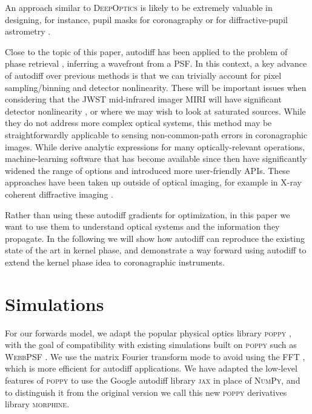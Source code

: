 \documentclass[modern]{aastex63}
\begin{document}
An approach similar to \textsc{DeepOptics} is likely to be extremely valuable in designing, for instance, pupil masks for coronagraphy \citep[e.g.][]{guyon03,carlotti11} or for diffractive-pupil astrometry \citep[e.g.][]{guyon12,tuthill18}. 

Close to the topic of this paper, autodiff has been applied to the problem of phase retrieval \citep{jurling14,paine19}, inferring a wavefront from a PSF. In this context, a key advance of autodiff over previous methods is that we can trivially account for pixel sampling/binning and detector nonlinearity. These will be important issues when considering that the JWST mid-infrared imager MIRI will have significant detector nonlinearity \citep{rieke15}, or where we may wish to look at saturated sources.  While they do not address more complex optical systems, this method may be straightforwardly applicable to sensing non-common-path errors in coronagraphic images. While \citet{jurling14} derive analytic expressions for many optically-relevant operations, machine-learning software that has become available since then have significantly widened the range of options and introduced more user-friendly APIs. These approaches have been taken up outside of optical imaging, for example in X-ray coherent diffractive imaging \citep{kandel19,nashed19}.

Rather than using these autodiff gradients for optimization, in this paper we want to use them to understand optical systems and the information they propagate.
In the following we will show how autodiff can reproduce the existing state of the art in kernel phase, and demonstrate a way forward using autodiff to extend the kernel phase idea to coronagraphic instruments.

\section{Simulations}
\label{sec:method}

For our forwards model, we adapt the popular physical optics library \textsc{poppy} \citep{poppy}, with the goal of compatibility with existing simulations built on \textsc{poppy} such as \textsc{WebbPSF} \citep{webbpsf}. We use the matrix Fourier transform mode to avoid using the FFT \citet{soummer07}, which is more efficient for autodiff applications. We have adapted the low-level features of \textsc{poppy} to use the Google autodiff library \textsc{jax} \citep{jax} in place of \textsc{NumPy}, and to distinguish it from the original version we call this new \textsc{poppy} derivatives library \textsc{morphine}. %
\end{document}
